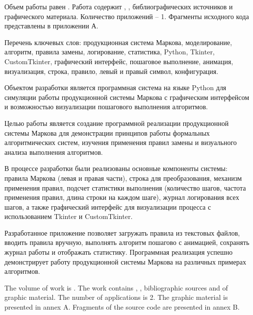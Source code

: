 
Объем работы равен . Работа содержит , ,  библиографических источников и  графического материала. Количество приложений – 1. Фрагменты исходного кода представлены в приложении А.

Перечень ключевых слов: продукционная система Маркова, моделирование, алгоритм, правила замены, логирование, статистика, Python, Tkinter, CustomTkinter, графический интерфейс, пошаговое выполнение, анимация, визуализация, строка, правило, левый и правый символ, конфигурация.

Объектом разработки является программная система на языке Python для симуляции работы продукционной системы Маркова с графическим интерфейсом и возможностью визуализации пошагового выполнения алгоритмов.

Целью работы является создание программной реализации продукционной системы Маркова для демонстрации принципов работы формальных алгоритмических систем, изучения применения правил замены и визуального анализа выполнения алгоритмов.

В процессе разработки были реализованы основные компоненты системы: правила Маркова (левая и правая части), строка для преобразования, механизм применения правил, подсчет статистики выполнения (количество шагов, частота применения правил, длина строки на каждом шаге), журнал логирования всех шагов, а также графический интерфейс для визуализации процесса с использованием Tkinter и CustomTkinter.

Разработанное приложение позволяет загружать правила из текстовых файлов, вводить правила вручную, выполнять алгоритм пошагово с анимацией, сохранять журнал работы и отображать статистику. Программная реализация успешно демонстрирует работу продукционной системы Маркова на различных примерах алгоритмов.


The volume of work is . The work contains , ,  bibliographic sources and  of graphic material. The number of applications is 2. The graphic material is presented in annex A. Fragments of the source code are presented in annex B.


